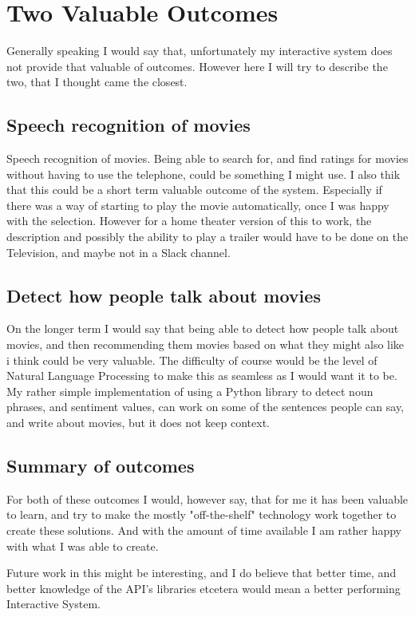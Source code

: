 \documentclass[11pt,fleqn]{book} %
\begin{document}
\chapter{Two Valuable Outcomes}
Generally speaking I would say that, unfortunately my interactive system does not provide that valuable of outcomes.
However here I will try to describe the two, that I thought came the closest.

\section{Speech recognition of movies}
Speech recognition of movies. Being able to search for, and find ratings for movies without having to use the telephone, could be something I might use.
I also thik that this could be a short term valuable outcome of the system. Especially if there was a way of starting to play the movie automatically, once I was happy with the selection. However for a home theater version of this to work, the description and possibly the ability to play a trailer would have to be done on the Television, and maybe not in a Slack channel.

\section{Detect how people talk about movies}
On the longer term I would say that being able to detect how people talk about movies, and then recommending them movies based on what they might also like i think could be very valuable. The difficulty of course would be the level of Natural Language Processing\cite{Wikipedia2017NaturalProcessing} to make this as seamless as I would want it to be. 
My rather simple implementation of using a Python library \cite{TextBlobTutorial:Documentation} to detect noun phrases, and sentiment values, can work on some of the sentences people can say, and write about movies, but it does not keep context. 
\section{Summary of outcomes}
For both of these outcomes I would, however say, that for me it has been valuable to learn, and try to make the mostly "off-the-shelf" technology work together to create these solutions. And with the amount of time available I am rather happy with what I was able to create.

Future work in this might be interesting, and I do believe that better time, and better knowledge of the API's libraries etcetera would mean a better performing Interactive System.

\printbibliography

\vfill
\end{document}
